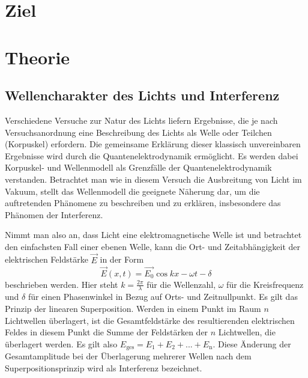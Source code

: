\section{Ziel}
\label{sec:Ziel}


\section{Theorie}
\label{sec:Theorie}

\subsection{Wellencharakter des Lichts und Interferenz}
\label{ssec:Interferenz}

Verschiedene Versuche zur Natur des Lichts liefern Ergebnisse, die je nach Versuchsanordnung eine Beschreibung des 
Lichts als Welle oder Teilchen (Korpuskel) erfordern. Die gemeinsame Erklärung dieser klassisch unvereinbaren Ergebnisse 
wird durch die Quantenelektrodynamik ermöglicht. Es werden dabei Korpuskel- und Wellenmodell als Grenzfälle
der Quantenelektrodynamik verstanden. Betrachtet man wie in diesem Versuch die Ausbreitung von Licht im Vakuum, stellt das 
Wellenmodell die geeignete Näherung dar, um die auftretenden Phänomene zu beschreiben und zu erklären, insbesondere 
das Phänomen der Interferenz. 

Nimmt man also an, dass Licht eine elektromagnetische Welle ist und betrachtet den einfachsten Fall einer ebenen Welle, 
kann die Ort- und Zeitabhängigkeit der elektrischen Feldstärke $\vec{E}$ in der Form
\begin{equation}
    \vec{E}(x,t) = \vec{E_0} \cos{kx - \omega t - \delta}
\label{eqn:wave}
\end{equation}
beschrieben werden. Hier steht $k = \frac{2\pi}{\lambda}$ für die Wellenzahl, $\omega$ für die Kreisfrequenz und 
$\delta$ für einen Phasenwinkel in Bezug auf Orts- und Zeitnullpunkt. Es gilt das Prinzip der linearen Superposition.
Werden in einem Punkt im Raum $n$ Lichtwellen überlagert, ist die Gesamtfeldstärke des resultierenden elektrischen Feldes 
in diesem Punkt die Summe der Feldstärken der $n$ Lichtwellen, die überlagert werden. Es gilt also 
$E_\text{ges} = E_1 + E_2 + ... + E_\text{n}$. Diese Änderung der Gesamtamplitude bei der Überlagerung mehrerer Wellen nach dem 
Superpositionsprinzip wird als Interferenz bezeichnet. 

